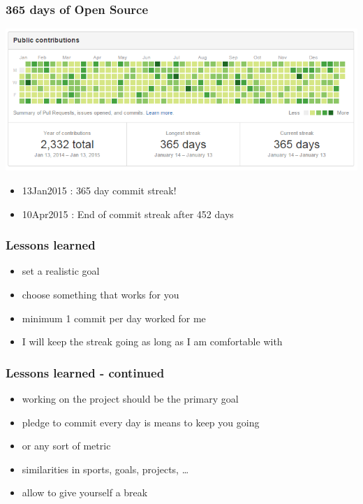 \documentclass[14pt]{beamer}
\begin{document}
  \begin{frame}
    \frametitle{365 days of Open Source}
    \includegraphics[scale=.45]{github_oss365_13jan2015.png}
    \begin{itemize}
      \item 13Jan2015 : 365 day commit streak!
      \item 10Apr2015 : End of commit streak after 452 days
    \end{itemize}
  \end{frame}
  \begin{frame}
    \frametitle{Lessons learned}
    \begin{itemize}
      \item set a realistic goal
      \item choose something that works for you
      \item minimum 1 commit per day worked for me
      \item I will keep the streak going as long as I am comfortable with
    \end{itemize}
  \end{frame}
  \begin{frame}
    \frametitle{Lessons learned - continued}
    \begin{itemize}
      \item working on the project should be the primary goal
      \item pledge to commit every day is means to keep you going
      \item or any sort of metric
      \item similarities in sports, goals, projects, \ldots
      \item allow to give yourself a break
    \end{itemize}
  \end{frame}
\end{document}
